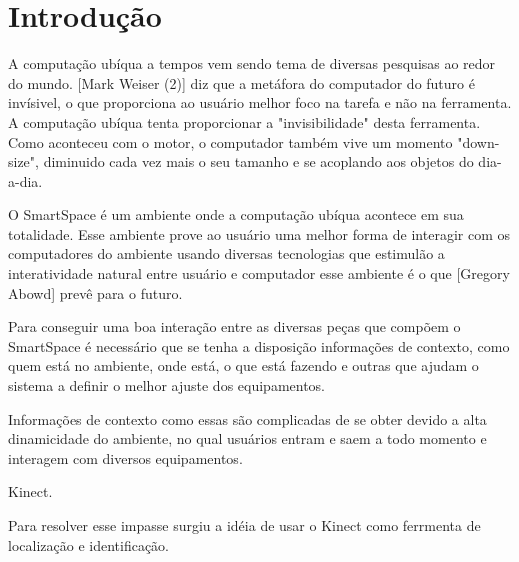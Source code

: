 \textual

\chapter{Introdução}
	
A computação ubíqua a tempos vem sendo tema de diversas pesquisas ao redor do mundo. [Mark Weiser (2)] diz que a metáfora do computador do futuro é invísivel, o que proporciona ao usuário melhor foco na tarefa e não na ferramenta. A computação ubíqua tenta proporcionar a "invisibilidade" desta ferramenta. Como aconteceu com o motor, o computador também vive um momento "down-size", diminuido cada vez mais o seu tamanho e se acoplando aos objetos do dia-a-dia.

O SmartSpace é um ambiente onde a computação ubíqua acontece em sua totalidade. Esse ambiente prove ao usuário uma melhor forma de interagir com os computadores do ambiente usando diversas tecnologias que estimulão a interatividade natural entre usuário e computador esse ambiente é o que [Gregory Abowd] prevê para o futuro.

Para conseguir uma boa interação entre as diversas peças que compõem o SmartSpace é necessário que se tenha a disposição informações de contexto,  como quem está no ambiente, onde está, o que está fazendo e outras que ajudam o sistema a definir o melhor ajuste dos equipamentos.

Informações de contexto como essas são complicadas de se obter devido a alta dinamicidade do ambiente, no qual usuários entram e saem a todo momento e interagem com diversos equipamentos.

Kinect.

Para resolver esse impasse surgiu a idéia de usar o Kinect como ferrmenta de localização e identificação.
